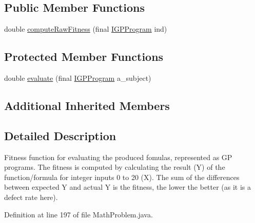 \subsection*{Public Member Functions}
\begin{DoxyCompactItemize}
\item 
double \hyperlink{classexamples_1_1gp_1_1_math_problem_1_1_formula_fitness_function_aae5615467587ed81540aa4d565142d5e}{compute\-Raw\-Fitness} (final \hyperlink{interfaceorg_1_1jgap_1_1gp_1_1_i_g_p_program}{I\-G\-P\-Program} ind)
\end{DoxyCompactItemize}
\subsection*{Protected Member Functions}
\begin{DoxyCompactItemize}
\item 
double \hyperlink{classexamples_1_1gp_1_1_math_problem_1_1_formula_fitness_function_a3ee84c1e5fddebbacf41c1b3a2376fd4}{evaluate} (final \hyperlink{interfaceorg_1_1jgap_1_1gp_1_1_i_g_p_program}{I\-G\-P\-Program} a\-\_\-subject)
\end{DoxyCompactItemize}
\subsection*{Additional Inherited Members}


\subsection{Detailed Description}
Fitness function for evaluating the produced fomulas, represented as G\-P programs. The fitness is computed by calculating the result (Y) of the function/formula for integer inputs 0 to 20 (X). The sum of the differences between expected Y and actual Y is the fitness, the lower the better (as it is a defect rate here). 

Definition at line 197 of file Math\-Problem.\-java.



